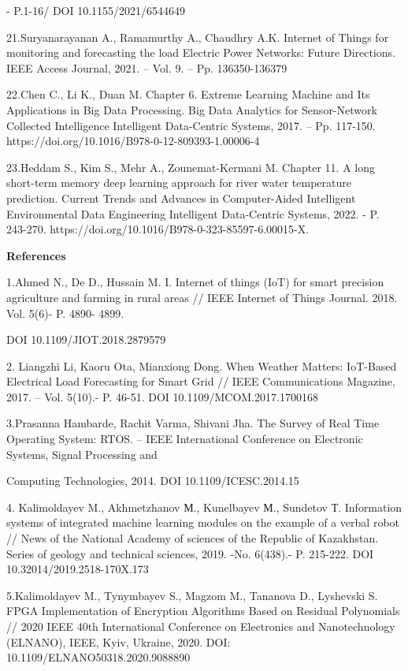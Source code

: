 - P.1-16/ DOI 10.1155/2021/6544649

21.Suryanarayanan A., Ramamurthy A., Chaudhry A.K. Internet of Things
for monitoring and forecasting the load Electric Power Networks: Future
Directions. IEEE Access Journal, 2021. -- Vol. 9. -- Pp. 136350-136379

22.Chen C., Li K., Duan M. Chapter 6. Extreme Learning Machine and Its
Applications in Big Data Processing. Big Data Analytics for
Sensor-Network Collected Intelligence Intelligent Data-Centric Systems,
2017. -- Pp. 117-150. https://doi.org/10.1016/B978-0-12-809393-1.00006-4

23.Heddam S., Kim S., Mehr A., Zounemat-Kermani M. Chapter 11. A long
short-term memory deep learning approach for river water temperature
prediction. Current Trends and Advances in Computer-Aided Intelligent
Environmental Data Engineering Intelligent Data-Centric Systems, 2022. -
P. 243-270. https://doi.org/10.1016/B978-0-323-85597-6.00015-X.

{\bfseries References}

1.Ahmed N., De D., Hussain M. I. Internet of things (IoT) for smart
precision agriculture and farming in rural areas // IEEE Internet of
Things Journal. 2018. Vol. 5(6)- P. 4890- 4899.

DOI 10.1109/JIOT.2018.2879579

2. Liangzhi Li, Kaoru Ota, Mianxiong Dong. When Weather Matters:
IoT-Based Electrical Load Forecasting for Smart Grid // IEEE
Communications Magazine, 2017. -- Vol. 5(10).- P. 46-51. DOI
10.1109/MCOM.2017.1700168

3.Prasanna Hambarde, Rachit Varma, Shivani Jha. The Survey of Real Time
Operating System: RTOS. -- IEEE International Conference on Electronic
Systems, Signal Processing and

Computing Technologies, 2014. DOI 10.1109/ICESC.2014.15

4. Kalimoldayev M., Akhmetzhanov М., Kunelbayev М., Sundetov Т.
Information systems of integrated machine learning modules on the
example of a verbal robot // News of the National Academy of sciences of
the Republic of Kazakhstan. Series of geology and technical sciences,
2019. -No. 6(438).- P. 215-222. DOI 10.32014/2019.2518-170X.173

5.Kalimoldayev M., Tynymbayev S., Magzom M., Tananova D., Lyshevski S.
FPGA Implementation of Encryption Algorithms Based on Residual
Polynomials // 2020 IEEE 40th International Conference on Electronics
and Nanotechnology (ELNANO), IEEE, Kyiv, Ukraine, 2020. DOI:
10.1109/ELNANO50318.2020.9088890

